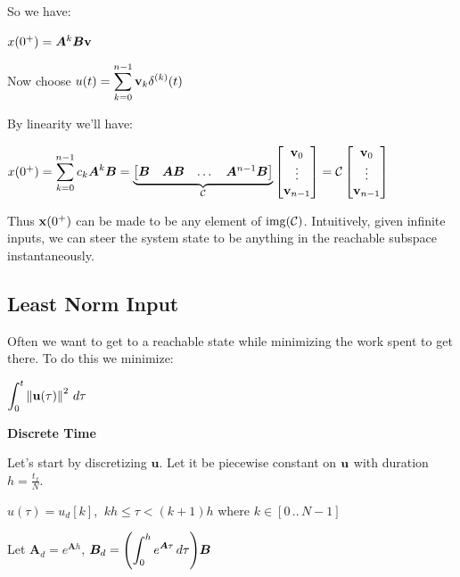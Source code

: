 \documentclass[11pt]{article}
\begin{document}
  So we have:

  \(x(0^+) = \bm{A}^k\bm{B}\mathbf{v}\)

  Now choose \(u(t) = \displaystyle \sum_{k = 0}^{n - 1}\mathbf{v}_k\delta^{(k)}(t)\)

  \pagebreak

  By linearity we'll have:

  \(x(0^+) = \displaystyle \sum_{k = 0}^{n - 1} c_k\bm{A}^k\bm{B}
  = \underbrace{\begin{bmatrix} \bm{B} & \bm{AB} & \dots & \bm{A}^{n - 1}\bm{B}\end{bmatrix}}_{\mathcal{C}}
  \begin{bmatrix}
    \mathbf{v}_0 \\
    \vdots \\
    \mathbf{v}_{n - 1}
  \end{bmatrix} =
  \mathcal{C}
  \begin{bmatrix}
    \mathbf{v}_0 \\
    \vdots \\
    \mathbf{v}_{n - 1}
  \end{bmatrix}\)

  \vspace{12pt}

  Thus \(\mathbf{x}(0^+)\) can be made to be any element of \(\mathrm{img}{\left( \mathcal{C} \right)}\). Intuitively,
  given infinite inputs, we can steer the system state to be anything in the
  reachable subspace instantaneously.

  \subsection{Least Norm Input}

  Often we want to get to a reachable state while minimizing the work spent to get there. To do this we minimize:

  \(\displaystyle \int_0^t \left\lVert\mathbf{u}(\tau)\right\rVert^2\,d\tau\)

  \vspace{12pt}

  \textbf{Discrete Time}

  Let's start by discretizing \(\bm{u}\). Let it be piecewise constant
  on \(\mathbf{u}\) with duration \(h = \frac{t_f}{N}\).

  \(u(\tau) = u_d[k]\), \(\ kh \le \tau < (k + 1)h\) where \(k \in [0\,..\,N - 1]\)

  Let \(\bm{A}_d = e^{\bm{A}h}\), \(\bm{B}_d = \displaystyle {\left( \int_{0}^h e^{\bm{A}\tau}\,d\tau \right)}\bm{B}\)
\end{document}
